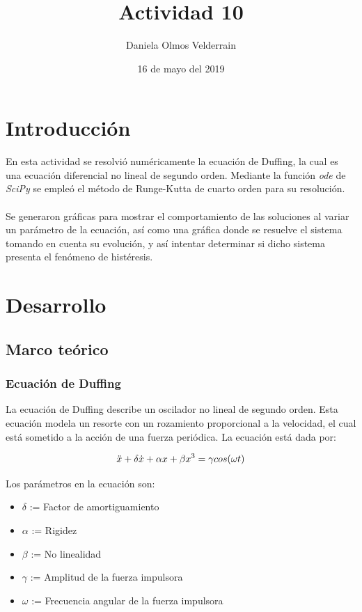 \documentclass[letterpaper,12pt]{article}
\title{Actividad 10}
\author{Daniela Olmos Velderrain}
\date{16 de mayo del 2019}
\begin{document}
\maketitle

\section{Introducción}
 En esta actividad se resolvió numéricamente la ecuación de Duffing, la cual es una ecuación diferencial no lineal de segundo orden. Mediante la función \emph{ode} de \emph{SciPy} se empleó el método de Runge-Kutta de cuarto orden para su resolución.\\\\
 Se generaron gráficas para mostrar el comportamiento de las soluciones al variar un parámetro de la ecuación, así como una gráfica donde se resuelve el sistema tomando en cuenta su evolución, y así intentar determinar si dicho sistema presenta el fenómeno de histéresis.
 
           
\section{Desarrollo}
            
\subsection{Marco teórico}
\subsubsection{Ecuación de Duffing}
La ecuación de Duffing describe un oscilador no lineal de segundo orden. Esta ecuación modela un resorte con un rozamiento proporcional a la velocidad, el cual está sometido a la acción de una fuerza periódica. La ecuación está dada por:

\[\Ddot{x} + \delta \Dot{x} + \alpha x + \beta x^{3} = \gamma cos( \omega t)\]

Los parámetros en la ecuación son:
\begin{itemize}
    \item $\delta$ := Factor de amortiguamiento 
    \item $\alpha$ := Rigidez 
    \item $\beta$ := No linealidad 
    \item $\gamma$ := Amplitud de la fuerza impulsora
    \item $\omega$ := Frecuencia angular de la fuerza impulsora 
\end{itemize}
\end{document}
